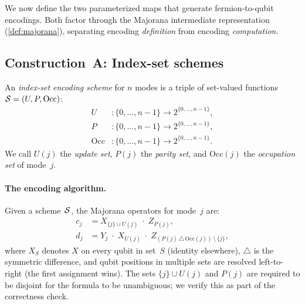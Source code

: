 %

We now define the two parameterized maps that generate fermion-to-qubit
encodings.  Both factor through the Majorana intermediate representation
(\cref{def:majorana}), separating encoding \emph{definition} from
encoding \emph{computation}.

\subsection{Construction~A: Index-set schemes}
\label{sec:index-set}

\begin{definition}
\label{def:index-set-scheme}
An \emph{index-set encoding scheme} for $n$ modes is a triple of
set-valued functions $\mathcal{S} = (U, P, \mathrm{Occ})$:
\begin{align}
  U &: \{0, \ldots, n{-}1\} \to 2^{\{0,\ldots,n{-}1\}},
    \label{eq:update-fn} \\
  P &: \{0, \ldots, n{-}1\} \to 2^{\{0,\ldots,n{-}1\}},
    \label{eq:parity-fn} \\
  \mathrm{Occ} &: \{0, \ldots, n{-}1\} \to 2^{\{0,\ldots,n{-}1\}}.
    \label{eq:occ-fn}
\end{align}
We call $U(j)$ the \emph{update set}, $P(j)$ the \emph{parity set},
and $\mathrm{Occ}(j)$ the \emph{occupation set} of mode~$j$.
\end{definition}

\paragraph{The encoding algorithm.}
Given a scheme~$\mathcal{S}$, the Majorana operators for mode~$j$ are:
\begin{align}
  c_j &= X_{\{j\} \cup U(j)} \;\cdot\; Z_{P(j)},
  \label{eq:cj-from-scheme} \\[4pt]
  d_j &= Y_j \;\cdot\; X_{U(j)} \;\cdot\;
    Z_{(P(j)\,\triangle\,\mathrm{Occ}(j))\,\setminus\,\{j\}},
  \label{eq:dj-from-scheme}
\end{align}
where $X_S$ denotes $X$ on every qubit in set~$S$ (identity elsewhere),
$\triangle$ is the symmetric difference, and qubit positions in
multiple sets are resolved left-to-right (the first assignment
wins).  The sets $\{j\} \cup U(j)$ and $P(j)$ are required to be
disjoint for the formula to be unambiguous; we verify this as part of
the correctness check.

